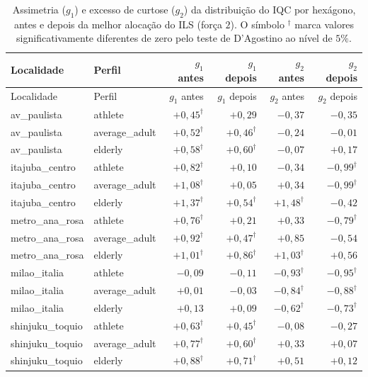 \documentclass[11pt,a4paper]{article}
\begin{document}
\renewcommand{\arraystretch}{1.15}
\begin{longtable}{@{}l l r r r r@{}}
\caption{Assimetria ($g_1$) e excesso de curtose ($g_2$) da distribuição do IQC por hexágono, antes e depois da melhor alocação do ILS (força $2$). O símbolo $^{\dagger}$ marca valores significativamente diferentes de zero pelo teste de D'Agostino ao nível de $5\%$.}\label{tab:ils-shape}\\
\toprule
Localidade & Perfil & $g_1$ antes & $g_1$ depois & $g_2$ antes & $g_2$ depois \\
\midrule
\endfirsthead
\toprule
Localidade & Perfil & $g_1$ antes & $g_1$ depois & $g_2$ antes & $g_2$ depois \\
\midrule
\endhead
av\_paulista & athlete & $+0{,}45^{\dagger}$ & $+0{,}29$ & $-0{,}37$ & $-0{,}35$ \\
av\_paulista & average\_adult & $+0{,}52^{\dagger}$ & $+0{,}46^{\dagger}$ & $-0{,}24$ & $-0{,}01$ \\
av\_paulista & elderly & $+0{,}58^{\dagger}$ & $+0{,}60^{\dagger}$ & $-0{,}07$ & $+0{,}17$ \\
itajuba\_centro & athlete & $+0{,}82^{\dagger}$ & $+0{,}10$ & $-0{,}34$ & $-0{,}99^{\dagger}$ \\
itajuba\_centro & average\_adult & $+1{,}08^{\dagger}$ & $+0{,}05$ & $+0{,}34$ & $-0{,}99^{\dagger}$ \\
itajuba\_centro & elderly & $+1{,}37^{\dagger}$ & $+0{,}54^{\dagger}$ & $+1{,}48^{\dagger}$ & $-0{,}42$ \\
metro\_ana\_rosa & athlete & $+0{,}76^{\dagger}$ & $+0{,}21$ & $+0{,}33$ & $-0{,}79^{\dagger}$ \\
metro\_ana\_rosa & average\_adult & $+0{,}92^{\dagger}$ & $+0{,}47^{\dagger}$ & $+0{,}85$ & $-0{,}54$ \\
metro\_ana\_rosa & elderly & $+1{,}01^{\dagger}$ & $+0{,}86^{\dagger}$ & $+1{,}03^{\dagger}$ & $+0{,}56$ \\
milao\_italia & athlete & $-0{,}09$ & $-0{,}11$ & $-0{,}93^{\dagger}$ & $-0{,}95^{\dagger}$ \\
milao\_italia & average\_adult & $+0{,}01$ & $-0{,}03$ & $-0{,}84^{\dagger}$ & $-0{,}88^{\dagger}$ \\
milao\_italia & elderly & $+0{,}13$ & $+0{,}09$ & $-0{,}62^{\dagger}$ & $-0{,}73^{\dagger}$ \\
shinjuku\_toquio & athlete & $+0{,}63^{\dagger}$ & $+0{,}45^{\dagger}$ & $-0{,}08$ & $-0{,}27$ \\
shinjuku\_toquio & average\_adult & $+0{,}77^{\dagger}$ & $+0{,}60^{\dagger}$ & $+0{,}33$ & $+0{,}07$ \\
shinjuku\_toquio & elderly & $+0{,}88^{\dagger}$ & $+0{,}71^{\dagger}$ & $+0{,}51$ & $+0{,}12$ \\
\bottomrule
\end{longtable}
\end{document}
